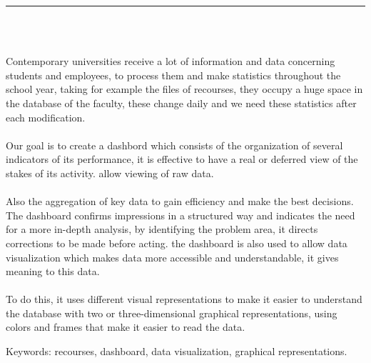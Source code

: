 \documentclass[12pt]{report}
\newenvironment{changemargin}[2]{%
\begin{list}{}{%
\setlength{\topsep}{0pt}%
\setlength{\leftmargin}{#1}%
\setlength{\rightmargin}{#2}%
\setlength{\listparindent}{\parindent}%
\setlength{\itemindent}{\parindent}%
\setlength{\parsep}{\parskip}%
}%
\item[]}{\end{list}}
\begin{document}
\newpage

\vspace*{0.2in}

\thispagestyle{empty}

\begin{center}
    {\color{Blue} \rule{3in}{1.4mm} }\\
    \vspace{0.1in}
    \scshape{\fontsize{34}{46}{\bfseries{\color{Blue}{Abstract}}}}
    \\
    \vspace{0.6in}
\end{center}
\begin{changemargin}{0.9cm}{0.9cm}
Contemporary universities receive a lot of information and data concerning students and employees, to process them and make statistics throughout the school year, taking for example the files of recourses, they occupy a huge space in the database of the faculty, these change daily and we need these statistics after each modification.
\\\\
Our goal is to create a dashbord which consists of the organization of several indicators of its performance, it is effective to have a real or deferred view of the stakes of its activity. allow viewing of raw data.
\\\\
Also the aggregation of key data to gain efficiency and make the best decisions. The dashboard confirms impressions in a structured way and indicates the need for a more in-depth analysis, by identifying the problem area, it directs corrections to be made before acting. the dashboard is also used to allow data visualization which makes data more accessible and understandable, it gives meaning to this data.
\\\\
To do this, it uses different visual representations to make it easier to understand the database with two or three-dimensional graphical representations, using colors and frames that make it easier to read the data.
\end{changemargin}

\vspace{1in}

\begin{changemargin}{0.9cm}{0.9cm}
Keywords: recourses, dashboard, data visualization, graphical representations.
\end{changemargin}
\end{document}
